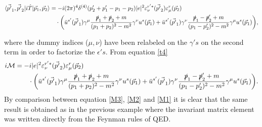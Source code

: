 \begin{example}
\begin{footnotesize}
	 \begin{equation}
		\begin{split}
			\braket{\vec{p'}_1,\vec{p'}_2|i\hat{T}|\vec{p}_1, \vec{p}_2}&=-i(2\pi)^4\delta^{(4)}(p'_2+p'_1-p_1-p_2)|e|^2\varepsilon_\nu^{r'*}(\vec{p'}_2)\varepsilon_\mu^{r}(\vec{p}_2)\\
			&\quad\cdot\bigg(\bar{u}^{s'}(\vec{p'}_1)\gamma^\mu \frac{\slashed p_1+\slashed p_2+m}{(p_1+p_2)^2-m^2}\gamma^\nu u^s(\vec{p}_1)+\bar{u}^{s'}(\vec{p'}_1)\gamma^\nu \frac{\slashed p_1-\slashed p'_2+m}{(p_1-p'_2)^2-m^2}\gamma^\mu u^s(\vec{p}_1)\bigg),
		\end{split}
		\label{t4}
	\end{equation}
	\end{footnotesize} 
	where the dummy indices ($\mu,\nu$) have been relabeled on the $\gamma's$ on the second term in order to factorize the $\epsilon's$. From equation \eqref{t4}
	 \begin{equation}
		\begin{split}
			i\mathcal{M}&=-i|e|^2\varepsilon_\nu^{r'*}(\vec{p'}_2)\varepsilon_\mu^{r}(\vec{p}_2)\\
			&\qquad\cdot\bigg(\bar{u}^{s'}(\vec{p'}_1)\gamma^\mu \frac{\slashed p_1+\slashed p_2+m}{(p_1+p_2)^2-m^2}\gamma^\nu u^s(\vec{p}_1)+\bar{u}^{s'}(\vec{p'}_1)\gamma^\nu \frac{\slashed p_1-\slashed p'_2+m}{(p_1-p'_2)^2-m^2}\gamma^\mu u^s(\vec{p}_1)\bigg).
		\end{split}
		\label{M3}
	\end{equation} 
	By comparison between equation \eqref{M3}, \eqref{M2} and \eqref{M1} it is clear that the same result is obtained as in the previous example where the invariant matrix element was written directly from the Feynman rules of QED.
	
\end{example}

